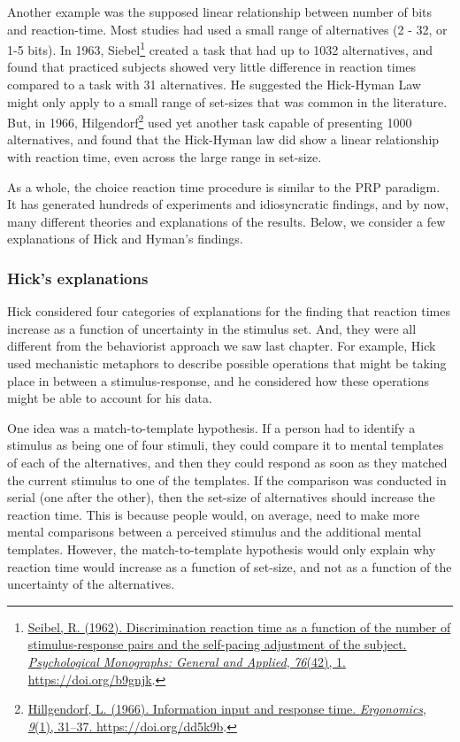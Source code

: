 \documentclass[
  oneside,
  12pt]{crumpbook}
\begin{document}
Another example was the supposed linear relationship between number of bits and reaction-time. Most studies had used a small range of alternatives (2 - 32, or 1-5 bits). In 1963, Siebel\footnote{\protect\hyperlink{ref-seibelDiscriminationReactionTime1962}{Seibel, R. (1962). Discrimination reaction time as a function of the number of stimulus-response pairs and the self-pacing adjustment of the subject. \emph{Psychological Monographs: General and Applied}, \emph{76}(42), 1. \url{https://doi.org/b9gnjk}}.} created a task that had up to 1032 alternatives, and found that practiced subjects showed very little difference in reaction times compared to a task with 31 alternatives. He suggested the Hick-Hyman Law might only apply to a small range of set-sizes that was common in the literature. But, in 1966, Hilgendorf\footnote{\protect\hyperlink{ref-hillgendorfInformationInputResponse1966}{Hillgendorf, L. (1966). Information input and response time. \emph{Ergonomics}, \emph{9}(1), 31--37. \url{https://doi.org/dd5k9b}}.} used yet another task capable of presenting 1000 alternatives, and found that the Hick-Hyman law did show a linear relationship with reaction time, even across the large range in set-size.

As a whole, the choice reaction time procedure is similar to the PRP paradigm. It has generated hundreds of experiments and idiosyncratic findings, and by now, many different theories and explanations of the results. Below, we consider a few explanations of Hick and Hyman's findings.

\hypertarget{hicks-explanations}{%
\subsubsection{Hick's explanations}\label{hicks-explanations}}

Hick considered four categories of explanations for the finding that reaction times increase as a function of uncertainty in the stimulus set. And, they were all different from the behaviorist approach we saw last chapter. For example, Hick used mechanistic metaphors to describe possible operations that might be taking place in between a stimulus-response, and he considered how these operations might be able to account for his data.

One idea was a match-to-template hypothesis. If a person had to identify a stimulus as being one of four stimuli, they could compare it to mental templates of each of the alternatives, and then they could respond as soon as they matched the current stimulus to one of the templates. If the comparison was conducted in serial (one after the other), then the set-size of alternatives should increase the reaction time. This is because people would, on average, need to make more mental comparisons between a perceived stimulus and the additional mental templates. However, the match-to-template hypothesis would only explain why reaction time would increase as a function of set-size, and not as a function of the uncertainty of the alternatives.
\end{document}
